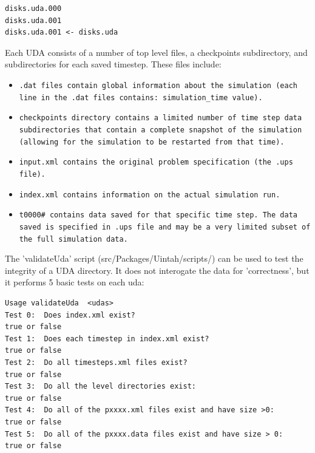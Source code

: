 \begin{Verbatim}[fontsize=\footnotesize]
disks.uda.000
disks.uda.001
disks.uda.001 <- disks.uda
\end{Verbatim}


Each UDA consists of a number of top level files, a checkpoints
subdirectory, and subdirectories for each saved timestep.  These files
include:

\begin{itemize}

\item \tt.dat \normalfont files contain global information about the
  simulation (each line in the .dat files contains: simulation\_time
  value).
\item \tt checkpoints \normalfont directory contains a limited
  number of time step data subdirectories that contain a complete
  snapshot of the simulation (allowing for the simulation to be
  restarted from that time).
\item \tt input.xml \normalfont contains the original problem
  specification (the .ups file).
\item \tt index.xml \normalfont contains information on the actual
  simulation run.
\item \tt t0000\# \normalfont contains data saved for that specific
  time step.  The data saved is specified in .ups file and may be a
  very limited subset of the full simulation data.

\end{itemize}

The 'validateUda' script (src/Packages/Uintah/scripts/) can be used to
test the integrity of a UDA directory. It does not interogate the data
for 'correctness', but it performs 5 basic tests on each uda:

\begin{Verbatim}
Usage validateUda  <udas>
Test 0:  Does index.xml exist?                                        true or false
Test 1:  Does each timestep in index.xml exist?                       true or false
Test 2:  Do all timesteps.xml files exist?                            true or false
Test 3:  Do all the level directories exist:                          true or false
Test 4:  Do all of the pxxxx.xml files exist and have size >0:        true or false
Test 5:  Do all of the pxxxx.data files exist and have size > 0:      true or false
\end{Verbatim}

